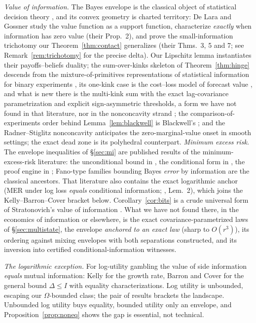 \documentclass[11pt]{article}
\begin{document}
\emph{Value of information.} The Bayes envelope is the classical object of
statistical decision theory \cite{howard1966,raiffa61}, and its convex
geometry is charted territory: De Lara and Gossner \cite{delaragossner}
study the value function as a support function, characterize
\emph{exactly} when information has zero value (their Prop.~2), and prove
the small-information trichotomy our Theorem~\ref{thm:contact}
generalizes (their Thms.~3, 5 and 7; see Remark~\ref{rem:trichotomy} for the
precise delta). Our Lipschitz lemma instantiates their payoffs--beliefs
duality; the sum-over-kinks skeleton of Theorem~\ref{thm:hinge} descends
from the mixture-of-primitives representations of statistical information
for binary experiments \cite{schervish89,reidwilliamson11}, its one-kink
case is the cost--loss model of forecast value \cite{murphy77,richardson00},
and what is new there is the multi-kink sum with the exact lag-covariance
parametrization and explicit
sign-asymmetric thresholds, a form we have not found in that
literature, nor in the nonconcavity strand
\cite{radnerstiglitz84,chadeschlee02,delaragilotte07,whitmeyer25}; the comparison-of-experiments order behind
Lemma~\ref{lem:blackwell} is Blackwell's \cite{blackwell53}; and the
Radner--Stiglitz nonconcavity \cite{radnerstiglitz84,chadeschlee02}
anticipates the zero-marginal-value onset in smooth settings; the exact
dead zone is its polyhedral counterpart. \emph{Minimum excess risk.} The envelope inequalities of
\S\ref{sec:mi} are published results of the minimum-excess-risk
literature: the unconditional bound in \cite{makhdoumi14,gyorfi23,xu20},
the conditional form in \cite{hafezkolahi21,xuraginsky22}, the proof
engine in \cite{russo16}; Fano-type families bounding Bayes \emph{error}
by information are the classical ancestors. That literature also
contains the exact logarithmic anchor (MER under log loss \emph{equals}
conditional information; \cite{xuraginsky22}, Lem.~2), which joins the
Kelly--Barron--Cover bracket below. Corollary~\ref{cor:bits} is a crude
universal form of Stratonovich's value of information \cite{stratonovich}.
What we have not found there, in the
economics of information or elsewhere, is the exact covariance-parametrized laws of \S\ref{sec:multistate},
the envelope \emph{anchored to an exact law} (sharp to $O(r^3)$), its ordering against mixing
envelopes with both separations constructed, and its inversion into
certified conditional-information witnesses.

\emph{The logarithmic exception.} For log-utility gambling the value of
side information \emph{equals} mutual information: Kelly \cite{kelly56}
for the growth rate, Barron and Cover \cite{barroncover88} for the general
bound $\Delta\le I$ with equality characterizations. Log utility is
unbounded, escaping our $\Omega$-bounded class; the pair of results
brackets the landscape. Unbounded log utility buys equality, bounded
utility only an envelope, and Proposition~\ref{prop:noneq} shows the gap is
essential, not technical.
\end{document}
